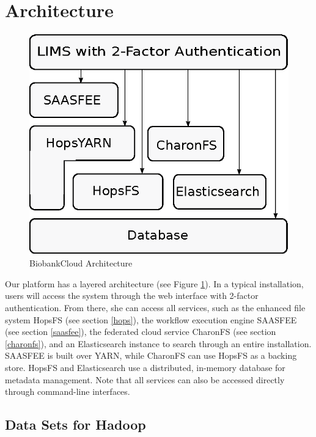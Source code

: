\section{Architecture}

 \begin{figure}[h]
 \centering
 \includegraphics[scale=0.75]{./imgs/stack.eps}
 \caption{BiobankCloud Architecture}
 \label{fig:arch}
\end{figure}

Our platform has a layered architecture (see Figure \ref{fig:arch}). In a typical installation, users will access the system through the web interface with 2-factor authentication. From there, she can access all services, such as the enhanced file system HopsFS (see section \ref{hops}), the workflow execution engine SAASFEE (see section \ref{saasfee}), the federated cloud service CharonFS (see section \ref{charonfs}), and an Elasticsearch instance to search through an entire installation. SAASFEE is built over YARN, while CharonFS can use HopsFS as a backing store. HopsFS and  Elasticsearch use a distributed, in-memory database for metadata management. Note that all services can also be accessed directly through command-line interfaces.

\subsection*{Data Sets for Hadoop}

